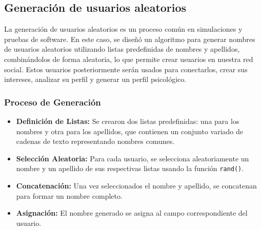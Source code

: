 \documentclass[9pt,letterpaper,onecolumn]{rho-class/rho}
\begin{document}
    \subsection{Generación de usuarios aleatorios}
    La generación de usuarios aleatorios es un proceso común en simulaciones y pruebas de software. 
    En este caso, se diseñó un algoritmo para generar nombres de usuarios aleatorios utilizando listas predefinidas de nombres y apellidos, combinándolos de forma aleatoria, lo que permite crear usuarios en nuestra red social.
    Estos usuarios posteriormente serán usados para conectarlos, crear sus intereses, analizar su perfil y generar un perfil psicológico.

    \subsubsection{Proceso de Generación}
    \begin{itemize}
        \item \textbf{Definición de Listas:} Se crearon dos listas predefinidas: una para los nombres y otra para los apellidos, que contienen un conjunto variado de cadenas de texto representando nombres comunes.
        \item \textbf{Selección Aleatoria:} Para cada usuario, se selecciona aleatoriamente un nombre y un apellido de sus respectivas listas usando la función \texttt{rand()}.
        \item \textbf{Concatenación:} Una vez seleccionados el nombre y apellido, se concatenan para formar un nombre completo.
        \item \textbf{Asignación:} El nombre generado se asigna al campo correspondiente del usuario.
    \end{itemize}
\end{document}
